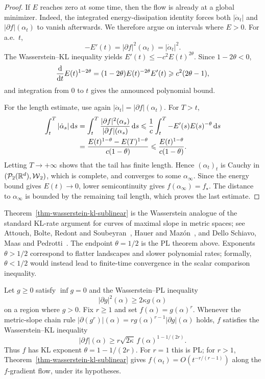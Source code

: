 \begin{proof}
	If \(E\) reaches zero at some time, then the flow is already at a global minimizer. Indeed, the integrated energy-dissipation identity forces both \(|\dot\alpha_t|\) and \(|\partial f|(\alpha_t)\) to vanish afterwards. We therefore argue on intervals where \(E>0\). For a.e.\ \(t\),
	\[
		-E'(t)=|\partial f|^2(\alpha_t)=|\dot\alpha_t|^2.
	\]
	The Wasserstein--KL inequality yields
	\(E'(t) \leq -c^2E(t)^{2\theta}\).
	Since \(1-2\theta<0\),
	\[
		\frac{\mathrm{d}}{\mathrm{d} t}E(t)^{1-2\theta}
		=
		(1-2\theta)E(t)^{-2\theta}E'(t)
		\geqslant
		c^2(2\theta-1),
	\]
	and integration from \(0\) to \(t\) gives the announced polynomial bound.

	For the length estimate, use again \(|\dot\alpha_t|=|\partial f|(\alpha_t)\). For \(T>t\),
	\[
		\begin{aligned}
		\int_t^T |\dot\alpha_s|\,\mathrm{d} s
		&=
		\int_t^T \frac{|\partial f|^2(\alpha_s)}{|\partial f|(\alpha_s)}\,\mathrm{d} s
		\leqslant
		\frac1c\int_t^T -E'(s)E(s)^{-\theta}\,\mathrm{d} s \\
		&=
		\frac{E(t)^{1-\theta}-E(T)^{1-\theta}}{c(1-\theta)}
		\leqslant
		\frac{E(t)^{1-\theta}}{c(1-\theta)}.
		\end{aligned}
	\]
	Letting \(T\to+\infty\) shows that the tail has finite length. Hence \((\alpha_t)_t\) is Cauchy in \((\mathcal{P}_2(\mathbb{R}^d),\operatorname{\mathcal{W}}_2)\), which is complete, and converges to some \(\alpha_\infty\). Since the energy bound gives \(E(t)\to0\), lower semicontinuity gives \(f(\alpha_\infty)=f_\star\). The distance to \(\alpha_\infty\) is bounded by the remaining tail length, which proves the last estimate.
\end{proof}

Theorem~\ref{thm-wasserstein-kl-sublinear} is the Wasserstein analogue of the standard KL-rate argument for curves of maximal slope in metric spaces; see Attouch, Bolte, Redont and Soubeyran~\citep{attouch-2010}, Hauer and Maz{\'o}n~\citep{HauerMazon2019KLSMetric}, and Dello Schiavo, Maas and Pedrotti~\citep{DelloSchiavoMaasPedrotti2023LocalConditions}. The endpoint \(\theta=1/2\) is the PL theorem above. Exponents \(\theta>1/2\) correspond to flatter landscapes and slower polynomial rates; formally, \(\theta<1/2\) would instead lead to finite-time convergence in the scalar comparison inequality.

\begin{prop}\label{prop-powers-pl-are-kl}
	Let \(g\geq0\) satisfy \(\inf g=0\) and the Wasserstein--PL inequality
	\[
		|\partial g|^2(\alpha)
		\geq
		2\kappa g(\alpha)
	\]
	on a region where \(g>0\). Fix \(r\geq1\) and set \(f(\alpha)=g(\alpha)^r\). Whenever the metric-slope chain rule \(|\partial(g^r)|(\alpha)=r g(\alpha)^{r-1}|\partial g|(\alpha)\) holds, \(f\) satisfies the Wasserstein--KL inequality
	\[
		|\partial f|(\alpha)
		\geq
		r\sqrt{2\kappa}\, f(\alpha)^{1-1/(2r)}.
	\]
	Thus \(f\) has KL exponent \(\theta=1-1/(2r)\). For \(r=1\) this is PL; for \(r>1\), Theorem~\ref{thm-wasserstein-kl-sublinear} gives \(f(\alpha_t)=O(t^{-r/(r-1)})\) along the \(f\)-gradient flow, under its hypotheses.
\end{prop}

